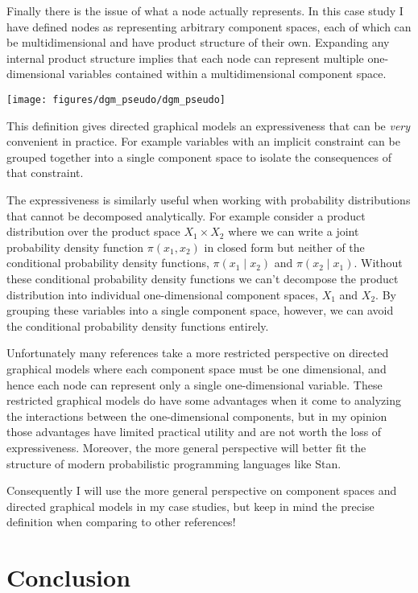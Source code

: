\documentclass[]{article}
\begin{document}
Finally there is the issue of what a node actually represents. In this
case study I have defined nodes as representing arbitrary component
spaces, each of which can be multidimensional and have product structure
of their own. Expanding any internal product structure implies that each
node can represent multiple one-dimensional variables contained within a
multidimensional component space.

\texttt{[image: figures/dgm\_pseudo/dgm\_pseudo]}

This definition gives directed graphical models an expressiveness that
can be \emph{very} convenient in practice. For example variables with an
implicit constraint can be grouped together into a single component
space to isolate the consequences of that constraint.

The expressiveness is similarly useful when working with probability
distributions that cannot be decomposed analytically. For example
consider a product distribution over the product space
\(X_{1} \times X_{2}\) where we can write a joint probability density
function \(\pi(x_{1}, x_{2})\) in closed form but neither of the
conditional probability density functions, \(\pi(x_{1} \mid x_{2})\) and
\(\pi(x_{2} \mid x_{1})\). Without these conditional probability density
functions we can't decompose the product distribution into individual
one-dimensional component spaces, \(X_{1}\) and \(X_{2}\). By grouping
these variables into a single component space, however, we can avoid the
conditional probability density functions entirely.

Unfortunately many references take a more restricted perspective on
directed graphical models where each component space must be one
dimensional, and hence each node can represent only a single
one-dimensional variable. These restricted graphical models do have some
advantages when it come to analyzing the interactions between the
one-dimensional components, but in my opinion those advantages have
limited practical utility and are not worth the loss of expressiveness.
Moreover, the more general perspective will better fit the structure of
modern probabilistic programming languages like Stan.

Consequently I will use the more general perspective on component spaces
and directed graphical models in my case studies, but keep in mind the
precise definition when comparing to other references!

\hypertarget{conclusion}{%
\section{Conclusion}\label{conclusion}}
\end{document}
